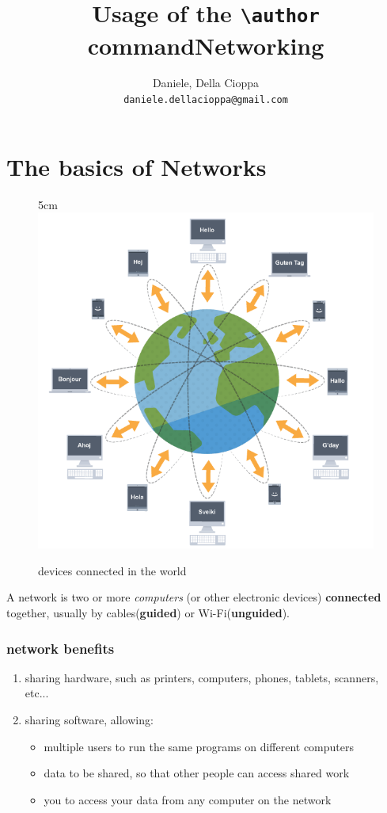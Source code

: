 \documentclass[a4paper,12pt]{article}
\author{
  Daniele, Della Cioppa\\
  \texttt{daniele.dellacioppa@gmail.com}
}
\title{Usage of the \texttt{\textbackslash author} command}
\begin{document}
\title{Networking}
\maketitle
\hypersetup{linkcolor=teal}
\tableofcontents
\hypersetup{linkcolor=blue}
\clearpage

\part{The basics of Networks}


\begin{figure}[21]{5cm}
\centering
\includegraphics[width=12cm]{./net.png}
\caption{devices connected in the world}\label{wrap-fig:1}
\end{figure}

A network is two or more \emph{computers} (or other electronic devices) \textbf{connected} together, usually by cables(\textbf{guided}) or Wi-Fi(\textbf{unguided}).



\section {network benefits}
\begin{enumerate}
\item {sharing hardware, such as printers, computers, phones, tablets, scanners, etc...}\footnotemark{}
\item {sharing software, allowing:}
    \begin{itemize}
    \item{multiple users to run the same programs on different computers}
    \item{data to be shared, so that other people can access shared work}
    \item{you to access your data from any computer on the network}
    \end{itemize}
\end{enumerate}
\end{document}

